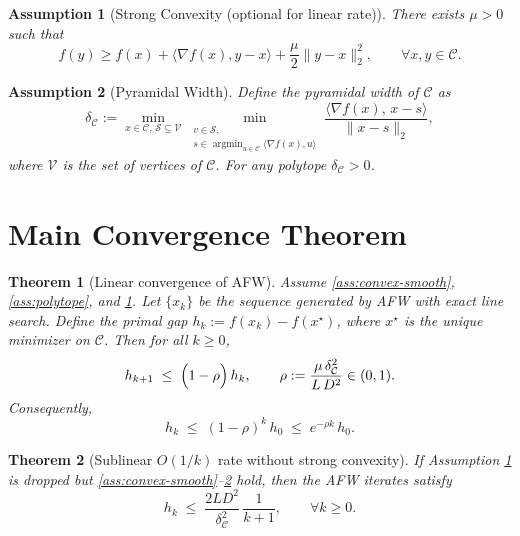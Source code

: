\documentclass{article}
\newtheorem{theorem}{Theorem}[section]
\newtheorem{assumption}{Assumption}[section]
\begin{document}
\begin{assumption}[Strong Convexity (optional for linear rate)]\label{ass:strong}
There exists $\mu>0$ such that
\[
f(y)\ge f(x)+\langle\nabla f(x),y-x\rangle+\frac{\mu}{2}\|y-x\|_2^2,\qquad\forall x,y\in\mathcal{C}.
\]
\end{assumption}

\begin{assumption}[Pyramidal Width]\label{ass:pyr}
Define the \emph{pyramidal width} of $\mathcal{C}$ as
\[
\delta_{\mathcal{C}}:=\min_{x\in\mathcal{C},\,\mathcal{S}\subseteq\mathcal{V}} 
\min_{\substack{v\in\mathcal{S},\\ s\in\operatorname{argmin}_{u\in\mathcal{C}}\langle \nabla f(x),u\rangle}}
\frac{\langle \nabla f(x),\,x-s\rangle}{\|x-s\|_2},
\]
where $\mathcal{V}$ is the set of vertices of $\mathcal{C}$.  For any polytope $\delta_{\mathcal{C}}>0$.
\end{assumption}

\section*{Main Convergence Theorem}
\begin{theorem}[Linear convergence of AFW]\label{thm:linear}
Assume \ref{ass:convex-smooth}, \ref{ass:polytope}, and \ref{ass:strong}.  
Let $\{x_k\}$ be the sequence generated by AFW with exact line search.  
Define the primal gap $h_k:=f(x_k)-f(x^\star)$, where $x^\star$ is the unique minimizer on $\mathcal{C}$.  
Then for all $k\ge0$,
\[
h_{k+1}\;\le\;\Bigl(1-\rho\Bigr)\,h_k,\qquad 
\rho:=\frac{\mu\,\delta_{\mathcal{C}}^2}{L\,D^2}\in(0,1).
\]
Consequently,
\[
h_k\;\le\;(1-\rho)^k\,h_0\;\le\;e^{-\rho k}\,h_0 .
\]
\end{theorem}

\begin{theorem}[Sublinear $O(1/k)$ rate without strong convexity]\label{thm:sublinear}
If Assumption \ref{ass:strong} is dropped but \ref{ass:convex-smooth}–\ref{ass:pyr} hold, then the AFW iterates satisfy
\[
h_k\;\le\;\frac{2L D^2}{\delta_{\mathcal{C}}^2}\,\frac{1}{k+1},\qquad\forall k\ge0 .
\]
\end{theorem}
\end{document}
